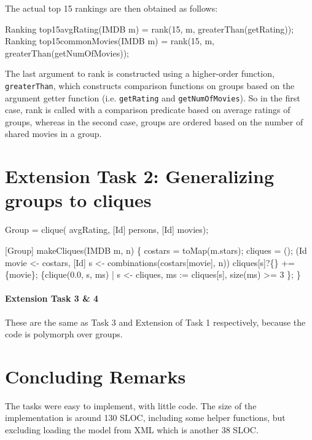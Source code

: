\documentclass[submission,copyright,creativecommons]{eptcs}
\begin{document}
The actual top 15 rankings are then obtained as follows:
\begin{rascal}
Ranking top15avgRating(IMDB m)    = rank(15, m, greaterThan(getRating));    
Ranking top15commonMovies(IMDB m) = rank(15, m, greaterThan(getNumOfMovies));
\end{rascal}

The last argument to rank is constructed using a higher-order function, \texttt{greaterThan}, which constructs comparison functions on groups based on the argument getter function (i.e. \texttt{getRating} and \texttt{getNumOfMovies}). So in the first case, rank is called with a comparison predicate based on average ratings of groups, whereas in the second case, groups are ordered based on the number of shared movies in a group.


\section{Extension Task 2: Generalizing groups to cliques}

\begin{rascal}
 Group = clique( avgRating, [Id] persons, [Id] movies);
\end{rascal}


\begin{rascal}
[Group] makeCliques(IMDB m,  n) \{{}
    costars = toMap(m.stars); cliques = ();
     (Id movie \textless{}- costars, [Id] s \textless{}- combinations(costars{}[movie], n))
      cliques{}[s]?\{\} += \{{}movie\}{};
     \{{}clique(0.0, s, ms) | s \textless{}- cliques, ms := cliques{}[s], size(ms) \textgreater{}= 3 \}{};
\}{}
\end{rascal}

\paragraph{Extension Task 3 \& 4}

These are the same as Task 3 and Extension of Task 1 respectively,
because the code is polymorph over groups.

\section{Concluding Remarks}

The tasks were easy to implement, with little code. The size of the
implementation is around 130 SLOC, including some helper functions,
but excluding loading the model from XML which is another 38 SLOC.
\end{document}
